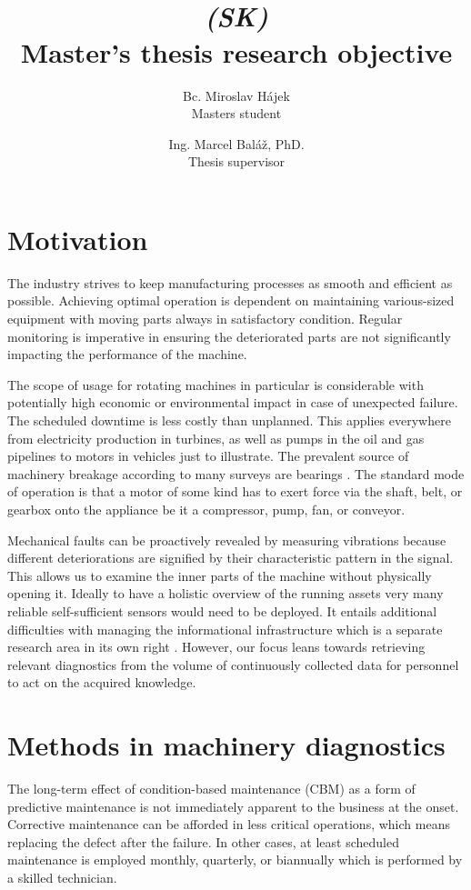 \documentclass[11pt, a4paper, english]{article}
\title{
	\textbf{\TitleEN} \\ \vspace{0.2em} 
	\large \emph{\Title\;(SK)} \\ 
	\vspace{0.7em} \large Master's thesis research objective
}
\author{Bc. Miroslav Hájek \\ \small{Masters student} \and Ing. Marcel Baláž, PhD. \\ \small{Thesis supervisor}}
\date{}
\begin{document}

\begin{refsection}
\maketitle
{}

\section{Motivation} 
The industry strives to keep manufacturing processes as smooth and efficient as possible. Achieving optimal operation is dependent on maintaining various-sized equipment with moving parts always in satisfactory condition. Regular monitoring is imperative in ensuring the deteriorated parts are not significantly impacting the performance of the machine.

The scope of usage for rotating machines in particular is considerable with potentially high economic or environmental impact in case of unexpected failure. The scheduled downtime is less costly than unplanned. This applies everywhere from electricity production in turbines, as well as pumps in the oil and gas pipelines to motors in vehicles just to illustrate. The prevalent source of machinery breakage according to many surveys are bearings \cite{goel_methodology_2022}.  The standard mode of operation is that a motor of some kind has to exert force via the shaft, belt, or gearbox onto the appliance be it a compressor, pump, fan, or conveyor.
 
Mechanical faults can be proactively revealed by measuring vibrations because different deteriorations are signified by their characteristic pattern in the signal. This allows us to examine the inner parts of the machine without physically opening it. Ideally to have a holistic overview of the running assets very many reliable self-sufficient sensors would need to be deployed. It entails additional difficulties with managing the informational infrastructure which is a separate research area in its own right \cite{wang_toward_2019}. However, our focus leans towards retrieving relevant diagnostics from the volume of continuously collected data for personnel to act on the acquired knowledge.

\section{Methods in machinery diagnostics}
The long-term effect of condition-based maintenance (CBM) as a form of predictive maintenance is not immediately apparent to the business at the onset. Corrective maintenance can be afforded in less critical operations, which means replacing the defect after the failure. In other cases, at least scheduled maintenance is employed monthly, quarterly, or biannually which is performed by a skilled technician. 


\end{refsection}
\end{document}
